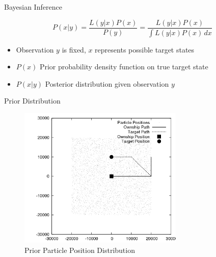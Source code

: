\documentclass{beamer}
\begin{document}

\begin{frame}{Bayesian Inference}

\begin{equation}
P(x|y) = \frac{L(y|x)P(x)}{P(y)} = \frac{L(y|x)P(x)}{\int \! L(y|x)P(x) \, dx}
\end{equation}

\vspace{1cm}

\begin{itemize}
\item Observation \(y\) is fixed, \(x\) represents possible target states
\item \(P(x)\) Prior probability density function on true target state
\item \(P(x|y)\) Posterior distribution given observation \(y\)
\end{itemize}

\end{frame}



\begin{frame}{Prior Distribution}

\begin{figure}
\centering
\includegraphics[width=0.7\textwidth]{data/particles_prior.png}
\caption{Prior Particle Position Distribution}
\end{figure}

\end{frame}


\end{document}
